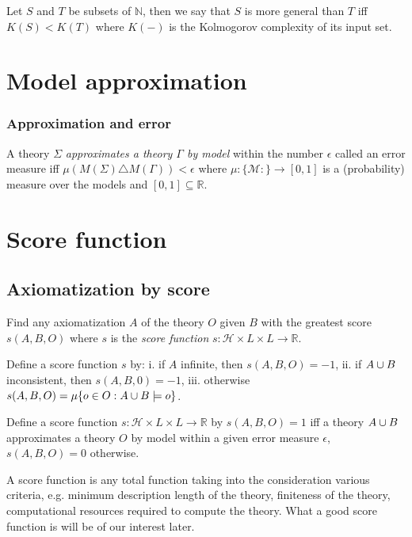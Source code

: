 \begin{defn}
Let $S$ and $T$ be subsets of $\mathbb{N}$, then we say that $S$ is more general than $T$ iff $K(S)<K(T)$ where $K(-)$ is the Kolmogorov complexity of its input set.
\end{defn}

\chapter{Model approximation}

\subsection{Approximation and error}
\begin{defn}
A theory $\Sigma$ \emph{approximates a theory $\Gamma$ by model} within the number $\epsilon$ called an error measure iff $\mu(M(\Sigma) \triangle M(\Gamma)) < \epsilon$ where $\mu:\{\mathcal{M}:\}\to [0,1]$ is a (probability) measure over the models and $[0,1] \subseteq \mathbb{R}$.
\end{defn}

\chapter{Score function}

\section{Axiomatization by score}
Find any axiomatization $A$ of the theory $O$ given $B$ with the greatest score $s(A,B,O)$ where $s$ is the \emph{score function}
$s:\mathcal{H} \times L \times L \to \mathbb{R}$.

\begin{exmp}
Define a score function $s$ by:
i. if $A$ infinite, then $s(A,B,O)=-1$,
ii. if $A \cup B$ inconsistent, then $s(A,B,0)=-1$,
iii. otherwise $s(A,B,O)=\mu\{o \in O : A \cup B \models o\}$.
\end{exmp}

\begin{exmp}
Define a score function $s:\mathcal{H} \times L \times L \to \mathbb{R}$ by $s(A,B,O)=1$ iff a theory $A \cup B$ approximates a theory $O$ by model within a given error measure $\epsilon$, $s(A,B,O)=0$ otherwise.
\end{exmp}

\begin{note}
A score function is any total function taking into the consideration various criteria, e.g. minimum description length of the theory, finiteness of the theory, computational resources required to compute the theory. What a good score function is will be of our interest later.
\end{note}

